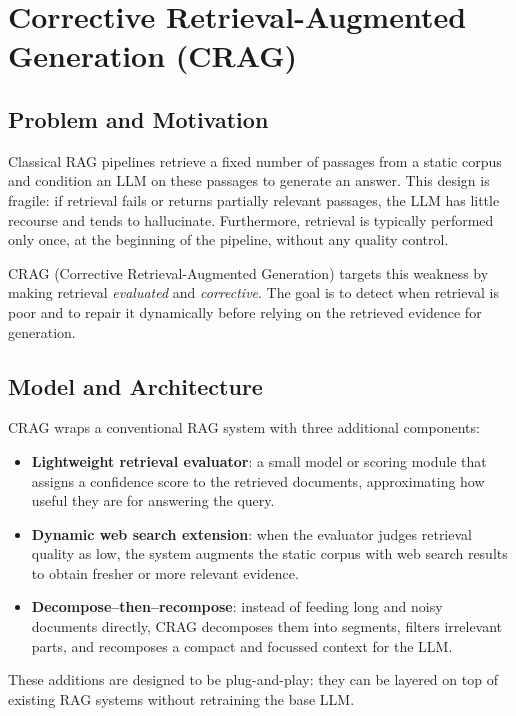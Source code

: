 \documentclass[11pt,a4paper]{article}
\begin{document}
\section{Corrective Retrieval-Augmented Generation (CRAG)}

\subsection{Problem and Motivation}

Classical RAG pipelines retrieve a fixed number of passages from a static corpus and condition an LLM on these passages to generate an answer. This design is fragile: if retrieval fails or returns partially relevant passages, the LLM has little recourse and tends to hallucinate. Furthermore, retrieval is typically performed only once, at the beginning of the pipeline, without any quality control.

CRAG (Corrective Retrieval-Augmented Generation) targets this weakness by making retrieval \emph{evaluated} and \emph{corrective}. The goal is to detect when retrieval is poor and to repair it dynamically before relying on the retrieved evidence for generation.

\subsection{Model and Architecture}

CRAG wraps a conventional RAG system with three additional components:
\begin{itemize}[leftmargin=1.2cm]
  \item \textbf{Lightweight retrieval evaluator}: a small model or scoring module that assigns a confidence score to the retrieved documents, approximating how useful they are for answering the query.
  \item \textbf{Dynamic web search extension}: when the evaluator judges retrieval quality as low, the system augments the static corpus with web search results to obtain fresher or more relevant evidence.
  \item \textbf{Decompose--then--recompose}: instead of feeding long and noisy documents directly, CRAG decomposes them into segments, filters irrelevant parts, and recomposes a compact and focussed context for the LLM.
\end{itemize}

These additions are designed to be plug-and-play: they can be layered on top of existing RAG systems without retraining the base LLM.
\end{document}
